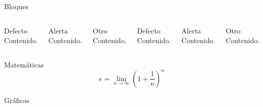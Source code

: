 \documentclass[10pt]{beamer}
\begin{document}
\begin{frame}{Bloques}

  \begin{columns}[T,onlytextwidth]
      \begin{block}{Defecto}
        Contenido.
      \end{block}

      \begin{alertblock}{Alerta}
        Contenido.
      \end{alertblock}

      \begin{exampleblock}{Otro}
        Contenido.
      \end{exampleblock}



      \begin{block}{Defecto}
        Contenido.
      \end{block}

      \begin{alertblock}{Alerta}
        Contenido.
      \end{alertblock}

      \begin{exampleblock}{Otro}
        Contenido.
      \end{exampleblock}

  \end{columns}
\end{frame}
\begin{frame}{Matemáticas}
  \begin{equation*}
    e = \lim_{n\to \infty} \left(1 + \frac{1}{n}\right)^n
  \end{equation*}
\end{frame}
\begin{frame}{Gráficas}
  \begin{figure}
  \end{figure}
\end{frame}
\end{document}
